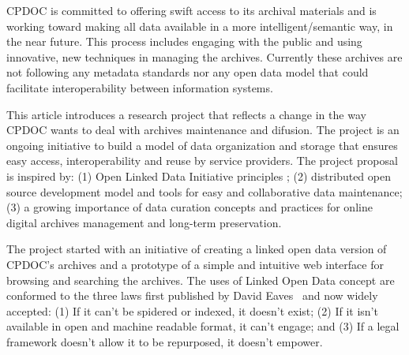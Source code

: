 CPDOC is committed to offering swift access to its archival materials
and is working toward making all data available in a more
intelligent/semantic way, in the near future. This process includes
engaging with the public and using innovative, new techniques in
managing the archives. Currently these archives are not following any
metadata standards nor any open data model that could facilitate
interoperability between information systems.

      
This article introduces a research project that reflects a change in
the way CPDOC wants to deal with archives maintenance and
difusion. The project is an ongoing initiative to build a model of
data organization and storage that ensures easy access,
interoperability and reuse by service providers. The project proposal
is inspired by: (1) Open Linked Data Initiative principles \cite{odi};
(2) distributed open source development model and tools for easy and
collaborative data maintenance; (3) a growing importance of data
curation concepts and practices for online digital archives management
and long-term preservation.
   
The project started with an initiative of creating a linked open data
version of CPDOC's archives and a prototype of a simple and intuitive
web interface for browsing and searching the archives. The uses of
Linked Open Data concept are conformed to the three laws first
published by David Eaves~\cite{3-law} and now widely accepted: (1) If
it can't be spidered or indexed, it doesn't exist; (2) If it isn't
available in open and machine readable format, it can't engage; and
(3) If a legal framework doesn't allow it to be repurposed, it doesn't
empower.
  
